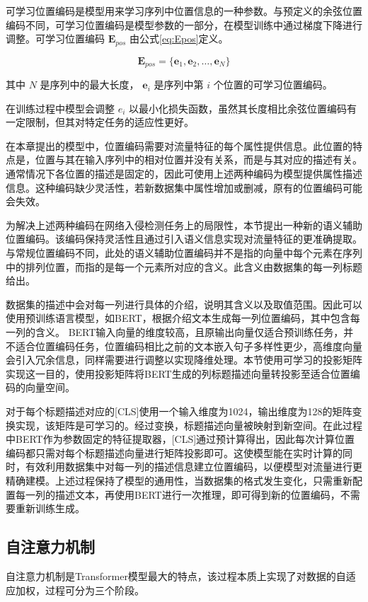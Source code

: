 可学习位置编码是模型用来学习序列中位置信息的一种参数。与预定义的余弦位置编码不同，可学习位置编码是模型参数的一部分，在模型训练中通过梯度下降进行调整。可学习位置编码 $\mathbf{E}_{pos}$ 由公式\ref{eq:Epos}定义。

\begin{equation}
\label{eq:Epos}
\mathbf{E}_{pos} = \{\mathbf{e}_{1}, \mathbf{e}_{2}, \ldots, \mathbf{e}_{N}\}
\end{equation}


其中 $N$ 是序列中的最大长度， $\mathbf{e}_{i}$ 是序列中第 $i$ 个位置的可学习位置编码。

在训练过程中模型会调整 $e_{i}$ 以最小化损失函数，虽然其长度相比余弦位置编码有一定限制，但其对特定任务的适应性更好。

在本章提出的模型中，位置编码需要对流量特征的每个属性提供信息。此位置的特点是，位置与其在输入序列中的相对位置并没有关系，而是与其对应的描述有关。通常情况下各位置的描述是固定的，因此可使用上述两种编码为模型提供属性描述信息。这种编码缺少灵活性，若新数据集中属性增加或删减，原有的位置编码可能会失效。

为解决上述两种编码在网络入侵检测任务上的局限性，本节提出一种新的语义辅助位置编码。该编码保持灵活性且通过引入语义信息实现对流量特征的更准确提取。与常规位置编码不同，此处的语义辅助位置编码并不是指的向量中每个元素在序列中的排列位置，而指的是每一个元素所对应的含义。此含义由数据集的每一列标题给出。

数据集的描述中会对每一列进行具体的介绍，说明其含义以及取值范围。因此可以使用预训练语言模型，如BERT，根据介绍文本生成每一列位置编码，其中包含每一列的含义。
BERT输入向量的维度较高，且原输出向量仅适合预训练任务，并不适合位置编码任务，位置编码相比之前的文本嵌入句子多样性更少，高维度向量会引入冗余信息，同样需要进行调整以实现降维处理。本节使用可学习的投影矩阵实现这一目的，使用投影矩阵将BERT生成的列标题描述向量转投影至适合位置编码的向量空间。

对于每个标题描述对应的[CLS]使用一个输入维度为1024，输出维度为128的矩阵变换实现，该矩阵是可学习的。经过变换，标题描述向量被映射到新空间。在此过程中BERT作为参数固定的特征提取器，[CLS]通过预计算得出，因此每次计算位置编码都只需对每个标题描述向量进行矩阵投影即可。这使模型能在实时计算的同时，有效利用数据集中对每一列的描述信息建立位置编码，以便模型对流量进行更精确建模。上述过程保持了模型的通用性，当数据集的格式发生变化，只需重新配置每一列的描述文本，再使用BERT进行一次推理，即可得到新的位置编码，不需要重新训练生成。

\subsection{自注意力机制}
自注意力机制是Transformer模型最大的特点，该过程本质上实现了对数据的自适应加权，过程可分为三个阶段。

